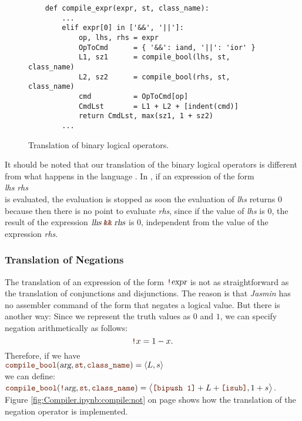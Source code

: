 \begin{figure}[!ht]
\centering
\begin{verbatim}
    def compile_expr(expr, st, class_name):
        ...
        elif expr[0] in ['&&', '||']:
            op, lhs, rhs = expr
            OpToCmd      = { '&&': iand, '||': 'ior' }
            L1, sz1      = compile_bool(lhs, st, class_name)
            L2, sz2      = compile_bool(rhs, st, class_name)
            cmd          = OpToCmd[op]
            CmdLst       = L1 + L2 + [indent(cmd)]
            return CmdLst, max(sz1, 1 + sz2)
        ...
\end{verbatim}
\vspace*{-0.3cm}
\caption{Translation of binary logical operators.}
\label{fig:Compiler.ipynb:compile:iand}
\end{figure}

It should be noted that our translation of the binary logical operators is different from
what happens in the language .  In , if an expression of the form
\\[0.2cm]
\hspace*{1.3cm}
\textsl{lhs} \mytt{\&\&} \textsl{rhs}
\\[0.2cm]
is evaluated, the evaluation is stopped as soon the evaluation of \textsl{lhs}
returns $0$ because then there is no point to evaluate \textsl{rhs}, since if the value of \textsl{lhs} is $0$,
the result of the expression $\textsl{lhs} \;\mytt{\&\&}\; \textsl{rhs}$ is $0$, independent from the value of
the expression \textsl{rhs}. 
\pagebreak

\subsubsection{Translation of Negations}
The translation of an expression of the form $\mytt{!}\textsl{expr}$ is not as straightforward as the
translation of conjunctions and disjunctions.  The reason is that \textsl{Jasmin} has no assembler command of
the form  that negates a logical value.  But there is another way: Since we represent the truth
values as $0$ and $1$, we can specify negation arithmetically as follows:
\[ \mytt{!}x = 1 - x. \]
Therefore, if we have
\\[0.2cm]
\hspace*{1.3cm}
$\mytt{compile\_bool}(\textsl{arg}, \mytt{st}, \mytt{class\_name}) = \pair(L, s)$
\\[0.2cm]
we can define:
\\[0.2cm]
\hspace*{1.3cm}
$\mytt{compile\_bool}(\mytt{!}\textsl{arg}, \mytt{st}, \mytt{class\_name})
  = \bigl\langle \mytt{[bipush 1]} + L + \mytt{[isub]}, 1 + s \bigr\rangle$.
Figure \ref{fig:Compiler.ipynb:compile:not} on page \pageref{fig:Compiler.ipynb:compile:not} shows how the
translation of the negation operator is implemented.

